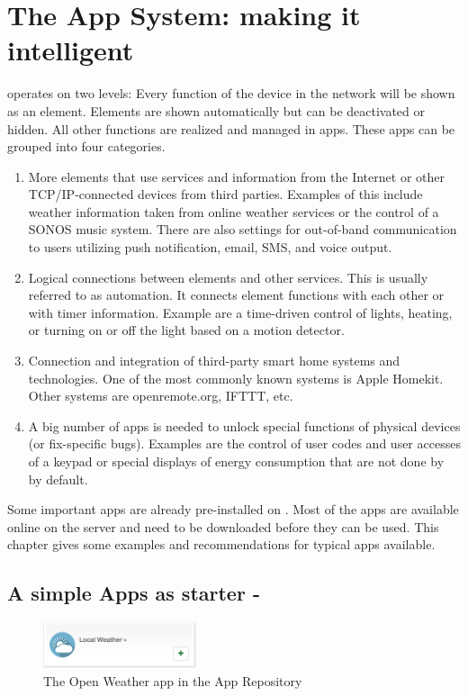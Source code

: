 \chapter{The App System: making it intelligent}
\label{apps}

\zway operates on two levels: Every function of the device in the network will be shown 
as an element. Elements are shown automatically but can be deactivated or hidden. All 
other functions are realized and managed in apps. These apps can be grouped into four categories.

\begin{enumerate}
\item More elements that use services and information from the Internet or other 
TCP/IP-connected devices from third parties. Examples of this include weather information 
taken from online weather services or the control of a SONOS music system. There are also 
settings for out-of-band communication to users utilizing push notification, email, 
SMS, and voice output.
\item Logical connections between elements and other services. This is usually referred 
to as automation. It connects element functions with each other or with timer information. 
Example are a time-driven control of lights, heating, or turning on or off the light based 
on a motion detector.
\item Connection and integration of third-party smart home systems and technologies. One 
of the most commonly known systems is Apple Homekit. Other systems are openremote.org, 
IFTTT, etc.
\item A big number of apps is needed to unlock special functions of physical devices 
(or fix-specific bugs). Examples are the control of user codes and user accesses of a 
keypad or special displays of energy consumption that are not done by \zway by default.
\end{enumerate}

Some important apps are already pre-installed on \zway. Most of the apps are available 
online on the server and need to be downloaded before they can be used. This chapter 
gives some examples and recommendations for typical apps available.

\section{A simple Apps as starter - }

\begin{figure}
\begin{center}
\includegraphics[width=0.4\textwidth]{pngs/cap6/app5.png}
\caption{The Open Weather app in the App Repository}
\label{app5}
\end{center}
\end{figure}

